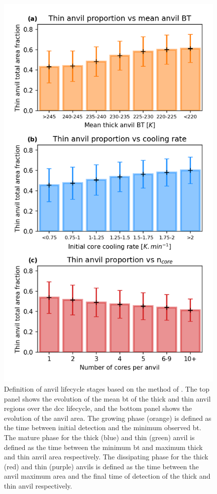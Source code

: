 \begin{figure}[tp]
    \centering
    \includegraphics[width=\textwidth]{figures/chapter3_02.png}
    \caption[
    Definition of anvil lifecycle stages based on the method of \citet{futyan_deep_2007}
    ]{
    Definition of anvil lifecycle stages based on the method of \citet{futyan_deep_2007}. The top panel shows the evolution of the mean \acrshort{bt} of the thick and thin anvil regions over the \acrshort{dcc} lifecycle, and the bottom panel shows the evolution of the anvil area. The growing phase (orange) is defined as the time between initial detection and the minimum observed \acrshort{bt}. The mature phase for the thick (blue) and thin (green) anvil is defined as the time between the minimum \acrshort{bt} and maximum thick and thin anvil area respectively. The dissipating phase for the thick (red) and thin (purple) anvils is defined as the time between the anvil maximum area and the final time of detection of the thick and thin anvil respectively.
    }
    \label{fig:lifecycle_example}
\end{figure}


